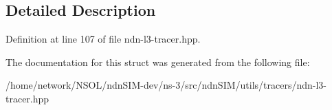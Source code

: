 \subsection{Detailed Description}


Definition at line 107 of file ndn-\/l3-\/tracer.\+hpp.



The documentation for this struct was generated from the following file\+:\begin{DoxyCompactItemize}
\item 
/home/network/\+N\+S\+O\+L/ndn\+S\+I\+M-\/dev/ns-\/3/src/ndn\+S\+I\+M/utils/tracers/ndn-\/l3-\/tracer.\+hpp\end{DoxyCompactItemize}
